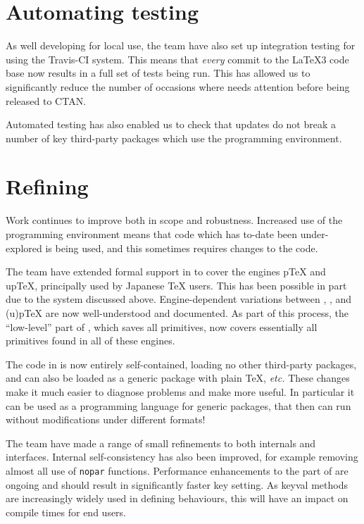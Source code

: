 \documentclass{ltnews}
\begin{document}
\section{Automating  testing}

As well developing  for local use, the team have also set
up integration testing for  using the Travis-CI
system. This means that \emph{every} commit to the \LaTeX3 code base
now results in a full set of tests being run. This has allowed us to
significantly reduce the number of occasions where  needs
attention before being released to CTAN.

Automated testing has also enabled us to check that 
updates do not break a number of key third-party packages which use
the programming environment.

\section{Refining }

Work continues to improve  both in scope and robustness. Increased
use of the programming environment means that code which has to-date been
under-explored is being used, and this sometimes requires changes to the code.

The team have extended formal support in  to cover the engines
p\TeX{} and up\TeX{}, principally used by Japanese \TeX{} users. This has been
possible in part due to the  system discussed above.
Engine-dependent variations between , ,
 and (u)p\TeX{} are now well-understood and documented. As part
of this process, the \enquote{low-level} part of , which saves all
primitives, now covers essentially all primitives found in all of these
engines.

The code in  is now entirely self-contained, loading no
other third-party packages, and can also be loaded as a generic
package with plain \TeX{}, \emph{etc.} These changes make it much
easier to diagnose problems and make  more useful.
%
In particular it can be used as a programming language for generic
packages, that then can run without modifications under different
formats!

The team have made a range of small refinements to both internals and
 interfaces. Internal self-consistency has also been improved, for
example removing almost all use of \texttt{nopar} functions. Performance
enhancements to the  part of  are ongoing and should
result in significantly faster key setting. As keyval methods are increasingly
widely used in defining behaviours, this will have an impact on compile times
for end users.
\end{document}

